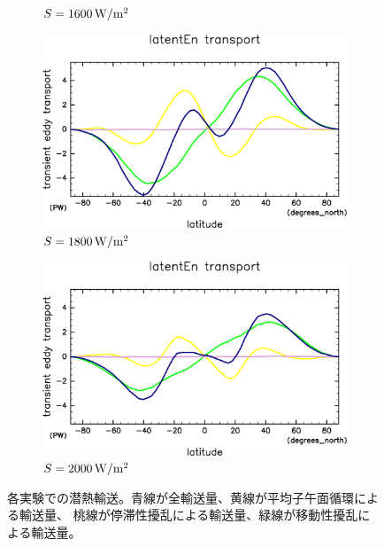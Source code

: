 \documentclass[body]{subfiles}
\begin{document}
\begin{figure}[t]
\begin{subfigure}{.4\textwidth}
		\caption{\(S=1600\hmu{W/m^2}\)}
	\end{subfigure}
	\begin{subfigure}{.4\textwidth}
		\centering
		\includegraphics[width=\columnwidth]{S1800/MeriHeatTrans@latentEn,time=3650:4015-crop-rotate.pdf}
		\caption{\(S=1800\hmu{W/m^2}\)}
	\end{subfigure}
	\begin{subfigure}{.4\textwidth}
		\centering
		\includegraphics[width=\columnwidth]{S2000/MeriHeatTrans@latentEn,time=7300:7665-crop-rotate.pdf}
		\caption{\(S=2000\hmu{W/m^2}\)}
	\end{subfigure}
	\caption[各実験での潜熱輸送]{
		各実験での潜熱輸送。青線が全輸送量、黄線が平均子午面循環による輸送量、
		桃線が停滞性擾乱による輸送量、緑線が移動性擾乱による輸送量。
	}\label{潜熱}
\end{figure}
\end{document}
